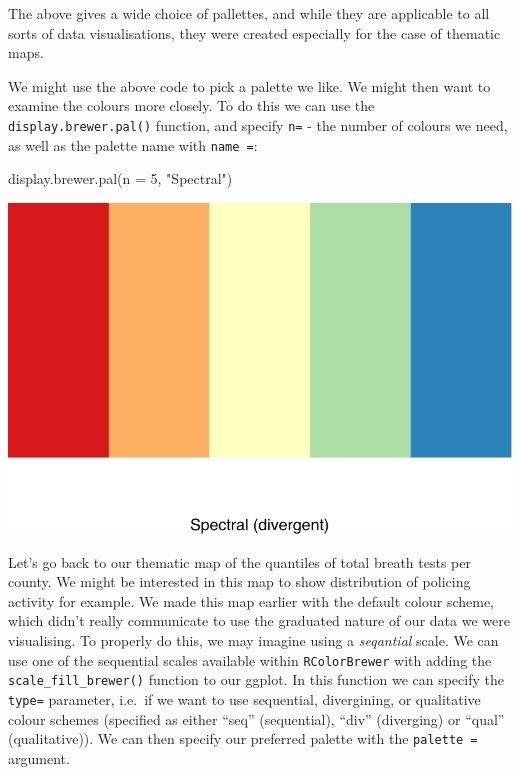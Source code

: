 \documentclass[
  krantz2]{krantz}
\makeatletter
\newenvironment{Shaded}{\begin{snugshade}}{\end{snugshade}}
\newcommand{\AttributeTok}[1]{\textcolor[rgb]{0.61,0.61,0.61}{#1}}
\newcommand{\DecValTok}[1]{\textcolor[rgb]{0.06,0.06,0.06}{#1}}
\newcommand{\FunctionTok}[1]{\textcolor[rgb]{0,0,0}{#1}}
\newcommand{\NormalTok}[1]{#1}
\newcommand{\StringTok}[1]{\textcolor[rgb]{0.5,0.5,0.5}{#1}}
\newenvironment{kframe}{%
\medskip{}
\setlength{\fboxsep}{.8em}
 \def\at@end@of@kframe{}%
 \ifinner\ifhmode%
  \def\at@end@of@kframe{\end{minipage}}%
  \begin{minipage}{\columnwidth}%
 \fi\fi%
 \def\FrameCommand##1{\hskip\@totalleftmargin \hskip-\fboxsep
 \colorbox{shadecolor}{##1}\hskip-\fboxsep
     \hskip-\linewidth \hskip-\@totalleftmargin \hskip\columnwidth}%
 \MakeFramed {\advance\hsize-\width
   \@totalleftmargin\z@ \linewidth\hsize
   \@setminipage}}%
 {\par\unskip\endMakeFramed%
 \at@end@of@kframe}
\renewenvironment{Shaded}{\begin{kframe}}{\end{kframe}}
\makeatother
\begin{document}
The above gives a wide choice of pallettes, and while they are applicable to all sorts of data visualisations, they were created especially for the case of thematic maps.

We might use the above code to pick a palette we like. We might then want to examine the colours more closely. To do this we can use the \texttt{display.brewer.pal()} function, and specify \texttt{n=} - the number of colours we need, as well as the palette name with \texttt{name\ =}:

\begin{Shaded}
\begin{Highlighting}[]
\FunctionTok{display.brewer.pal}\NormalTok{(}\AttributeTok{n =} \DecValTok{5}\NormalTok{, }\StringTok{"Spectral"}\NormalTok{)}
\end{Highlighting}
\end{Shaded}

\includegraphics{crime_mapping_files/figure-latex/unnamed-chunk-157-1.pdf}

Let's go back to our thematic map of the quantiles of total breath tests per county. We might be interested in this map to show distribution of policing activity for example. We made this map earlier with the default colour scheme, which didn't really communicate to use the graduated nature of our data we were visualising. To properly do this, we may imagine using a \emph{seqantial} scale. We can use one of the sequential scales available within \texttt{RColorBrewer} with adding the \texttt{scale\_fill\_brewer()} function to our ggplot. In this function we can specify the \texttt{type=} parameter, i.e.~if we want to use sequential, divergining, or qualitative colour schemes (specified as either ``seq'' (sequential), ``div'' (diverging) or ``qual'' (qualitative)). We can then specify our preferred palette with the \texttt{palette\ =} argument.
\end{document}
